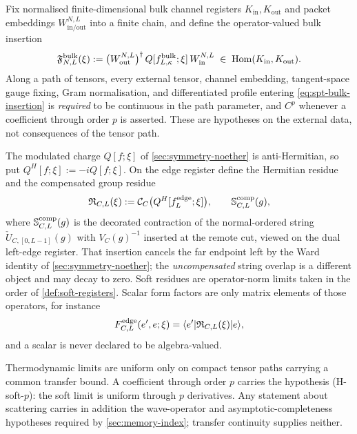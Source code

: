 \begin{definition}\label{def:soft-insertions}
Fix normalised finite-dimensional bulk channel registers $K_{\mathrm{in}},
K_{\mathrm{out}}$ and packet embeddings $W^{N,L}_{\mathrm{in/out}}$ into a
finite chain, and define the operator-valued bulk insertion
\begin{equation}
  \mathfrak{F}^{\mathrm{bulk}}_{N,L}(\xi)
   := \bigl(W^{N,L}_{\mathrm{out}}\bigr)^{\dagger}\,
      Q[f^{\mathrm{bulk}}_{L,\kappa};\xi]\,
      W^{N,L}_{\mathrm{in}}
   \;\in\;\operatorname{Hom}(K_{\mathrm{in}},K_{\mathrm{out}}).
  \label{eq:spt-bulk-insertion}
\end{equation}
Along a path of tensors, every external tensor, channel embedding,
tangent-space gauge fixing, Gram normalisation, and differentiated profile
entering \eqref{eq:spt-bulk-insertion} is \emph{required} to be continuous in
the path parameter, and $C^{p}$ whenever a coefficient through order $p$ is
asserted. These are hypotheses on the external data, not consequences of the
tensor path.

The modulated charge $Q[f;\xi]$ of \cref{sec:symmetry-noether} is
anti-Hermitian, so put $Q^{H}[f;\xi]:=-iQ[f;\xi]$. On the edge register define
the Hermitian residue and the compensated group residue
\begin{equation}
  \mathfrak{R}_{C,L}(\xi):=\mathcal{C}_C\bigl(Q^{H}[f^{\mathrm{edge}}_L;\xi]\bigr),
  \qquad
  \mathbb{S}^{\mathrm{comp}}_{C,L}(g),
  \label{eq:spt-residues}
\end{equation}
where $\mathbb{S}^{\mathrm{comp}}_{C,L}(g)$ is the decorated contraction of the
normal-ordered string $\check U_{C,[0,L-1]}(g)$ with $V_C(g)^{-1}$ inserted at
the remote cut, viewed on the dual left-edge register. That insertion cancels
the far endpoint left by the Ward identity of \cref{sec:symmetry-noether}; the
\emph{uncompensated} string overlap is a different object and may decay to
zero. Soft residues are operator-norm limits taken in the order of
\cref{def:soft-registers}. Scalar form factors are only matrix elements of
those operators, for instance
\begin{equation}
  F^{\mathrm{edge}}_{C,L}(e',e;\xi)
   = \langle e'|\mathfrak{R}_{C,L}(\xi)|e\rangle,
  \label{eq:spt-form-factor}
\end{equation}
and a scalar is never declared to be algebra-valued.

Thermodynamic limits are uniform only on compact tensor paths carrying a
common transfer bound. A coefficient through order $p$ carries the hypothesis
(H-soft-$p$): the soft limit is uniform through $p$ derivatives. Any statement
about scattering carries in addition the wave-operator and
asymptotic-completeness hypotheses required by \cref{sec:memory-index};
transfer continuity supplies neither.
\end{definition}

